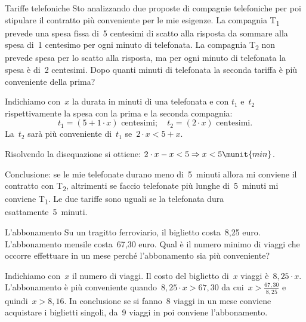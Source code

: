 \begin{problema}{Tariffe telefoniche}{}
Sto analizzando due proposte di compagnie telefoniche per poi stipulare
il contratto più conveniente per le mie esigenze. La compagnia
T\textsubscript{1} prevede una spesa fissa di~5 centesimi di scatto
alla risposta da sommare alla spesa di~1 centesimo per ogni minuto di
telefonata. La compagnia T\textsubscript{2} non prevede spesa per lo
scatto alla risposta, ma per ogni minuto di telefonata la spesa è di~2 
centesimi.
Dopo quanti minuti di telefonata la seconda tariffa è
più conveniente della prima?
\end{problema}

\begin{soluzione}
Indichiamo con~\(x\) la durata in minuti di una telefonata e con
\(t_{1}\) e~\(t_{2}\) rispettivamente la spesa con
la prima e la seconda compagnia:
\[t_{1}=(5+1\cdot x)\text{ centesimi};\quad t_{2}=(2\cdot x)\text{ 
centesimi.}\]
La~\(t_2\) sarà più conveniente di~\(t_1\) se~\(2\cdot x<5+x\).

Risolvendo la disequazione si ottiene:
\(2\cdot x-x<5\Rightarrow x<5\munit{min}\).

Conclusione: se le mie telefonate durano meno di~5~minuti allora mi
conviene il contratto con T\textsubscript{2}, altrimenti se faccio
telefonate più lunghe di~5~minuti mi conviene T\textsubscript{1}. Le
due tariffe sono uguali se la telefonata dura esattamente~5~minuti.
\end{soluzione}

\begin{problema}{L'abbonamento}{}
Su un tragitto ferroviario, il biglietto costa~8,25 euro.
L'abbonamento mensile costa~67,30 euro. Qual è il
numero minimo di viaggi che occorre effettuare in un mese perché
l'abbonamento sia più conveniente?
\end{problema}

\begin{soluzione}{}{}
Indichiamo con~\(x\) il numero di viaggi. Il costo del biglietto di~\(x\) 
viaggi è~\(8,25\cdot x\). L'abbonamento è più
conveniente quando~\(8,25\cdot x>67,30\) da cui~\(x>\frac{67,30}{8,25}\)
e quindi~\(x>8,16\). In conclusione se si fanno~8 viaggi in un
mese conviene acquistare i biglietti singoli, da~9 viaggi in poi
conviene l'abbonamento.
\end{soluzione}


